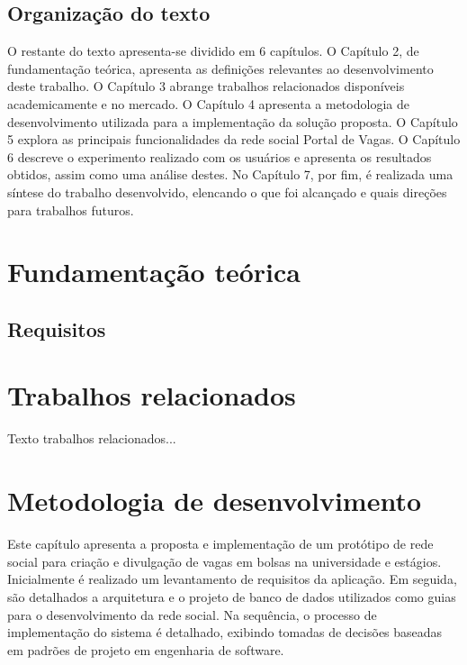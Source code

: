 \documentclass[cic,tc]{iiufrgs}
\begin{document}
\section{Organização do texto}
\label{introducaoOrganizacao}
O restante do texto apresenta-se dividido em 6 capítulos. O Capítulo 2, de fundamentação teórica, apresenta as definições relevantes ao desenvolvimento deste trabalho. O Capítulo 3 abrange trabalhos relacionados disponíveis academicamente e no mercado. O Capítulo 4 apresenta a metodologia de desenvolvimento utilizada para a implementação da solução proposta. O Capítulo 5 explora as principais funcionalidades da rede social Portal de Vagas. O Capítulo 6 descreve o experimento realizado com os usuários e apresenta os resultados obtidos, assim como uma análise destes. No Capítulo 7, por fim, é realizada uma síntese do trabalho desenvolvido, elencando o que foi alcançado e quais direções para trabalhos futuros.

\chapter{Fundamentação teórica}

\section{Requisitos}
\label{metodologiaRequisitos}

\chapter{Trabalhos relacionados}

Texto trabalhos relacionados...

\chapter{Metodologia de desenvolvimento}
\label{metodologiaDesenvolvimento}
Este capítulo apresenta a proposta e implementação de um protótipo de rede social para criação e divulgação de vagas em bolsas na universidade e estágios. Inicialmente é realizado um levantamento de requisitos da aplicação. Em seguida, são detalhados a arquitetura e o projeto de banco de dados utilizados como guias para o desenvolvimento da rede social. Na sequência, o processo de implementação do sistema é detalhado, exibindo tomadas de decisões baseadas em padrões de projeto em engenharia de software.
\end{document}
